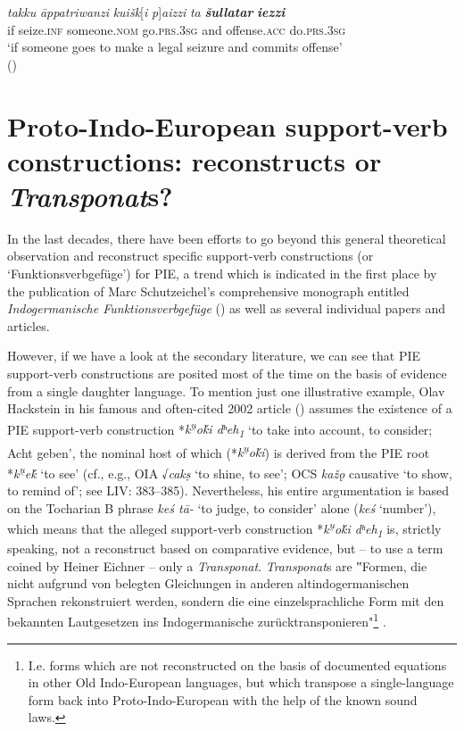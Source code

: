 \documentclass[output=paper,colorlinks,citecolor=brown]{langscibook}
\begin{document}
\ea\label{OldHittite}
\settowidth {}
\gll \textit{takku}	\textit{āppatriwanzi}	\textit{kuišk}[\textit{i}			\textit{p}]\textit{aizzi}		\textit{ta}	\textit{\textbf{šullatar}}  \textit{\textbf{iezzi}}\\
if    seize.\textsc{inf}   someone.\textsc{nom}   go.\textsc{prs}.\textsc{3sg}   and     offense.\textsc{acc}    do.\textsc{prs}.\textsc{3sg}\\ 
\glt `if someone goes to make a legal seizure and commits offense' \\
\hspace*{\fill}()
\z


\section{Proto-Indo-European support-verb constructions: reconstructs or \textit{Transponat}s?}

In the last decades, there have been efforts to go beyond this general theoretical observation and reconstruct specific support-verb constructions (or `Funktionsverbgefüge') for PIE, a trend which is indicated in the first place by the publication of Marc Schutzeichel’s comprehensive monograph entitled \textit{Indogermanische Funktionsverbgefüge} (\citealt{Schutzeichel2014}) as well as several individual papers and articles.

However, if we have a look at the secondary literature, we can see that PIE support-verb constructions are posited most of the time on the basis of evidence from a single daughter language. To mention just one illustrative example, Olav Hackstein in his famous and often-cited 2002 article (\citealt{Hackstein2002b}) assumes the existence of a PIE support-verb construction *\textit{k\textsuperscript{u̯}oḱi dʰeh\textsubscript{1}} ‘to take into account, to consider; Acht geben’, the nominal host of which (*\textit{k\textsuperscript{u̯}oḱi}) is derived from the PIE root *\textit{k\textsuperscript{u̯}eḱ} ‘to see’ (cf., e.g., OIA √\textit{cakṣ} ‘to shine, to see’; OCS \textit{kažǫ} causative ‘to show, to remind of’; see LIV: 383–385). Nevertheless, his entire argumentation is based on the Tocharian B phrase \textit{keś tā-} ‘to judge, to consider’ alone (\textit{keś} ‘number’), which means that the alleged support-verb construction *\textit{k\textsuperscript{u̯}oḱi dʰeh\textsubscript{1}} is, strictly speaking, not a reconstruct based on comparative evidence, but – to use a term coined by Heiner Eichner – only a \textit{Transponat}. \textit{Transponat}s are ‟Formen, die nicht aufgrund von belegten Gleichungen in anderen altindogermanischen Sprachen rekonstruiert werden, sondern die eine einzelsprachliche Form mit den bekannten Lautgesetzen ins Indogermanische zurücktransponieren"\footnote{I.e. forms which are not reconstructed on the basis of documented equations in other Old Indo-European languages, but which transpose a single-language form back into Proto-Indo-European with the help of the known sound laws.} \citep[12]{Krisch1996}.
\end{document}
